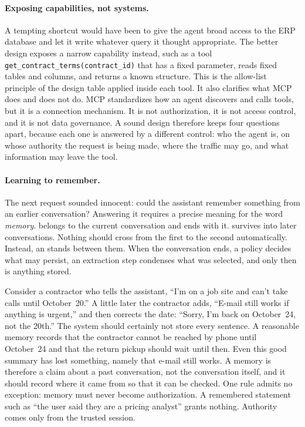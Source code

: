 \paragraph{Exposing capabilities, not systems.} A tempting shortcut would have been to give the agent broad access to the ERP database and let it write whatever query it thought appropriate. The better design exposes a narrow capability instead, such as a tool \texttt{get\_contract\_terms(contract\_id)} that has a fixed parameter, reads fixed tables and columns, and returns a known structure. This is the allow-list principle of the design table applied inside each tool. It also clarifies what MCP does and does not do. MCP standardizes how an agent discovers and calls tools, but it is a connection mechanism. It is not authorization, it is not access control, and it is not data governance. A sound design therefore keeps four questions apart, because each one is answered by a different control: who the agent is, on whose authority the request is being made, where the traffic may go, and what information may leave the tool.

\paragraph{Learning to remember.} The next request sounded innocent: could the assistant remember something from an earlier conversation? Answering it requires a precise meaning for the word \emph{memory}.  belongs to the current conversation and ends with it.  survives into later conversations. Nothing should cross from the first to the second automatically. Instead, an  stands between them. When the conversation ends, a policy decides what may persist, an extraction step condenses what was selected, and only then is anything stored.

Consider a contractor who tells the assistant, ``I'm on a job site and can't take calls until October~20.'' A little later the contractor adds, ``E-mail still works if anything is urgent,'' and then corrects the date: ``Sorry, I'm back on October~24, not the 20th.'' The system should certainly not store every sentence. A reasonable memory records that the contractor cannot be reached by phone until October~24 and that the return pickup should wait until then. Even this good summary has lost something, namely that e-mail still works. A memory is therefore a claim about a past conversation, not the conversation itself, and it should record where it came from so that it can be checked. One rule admits no exception: memory must never become authorization. A remembered statement such as ``the user said they are a pricing analyst'' grants nothing. Authority comes only from the trusted session.

